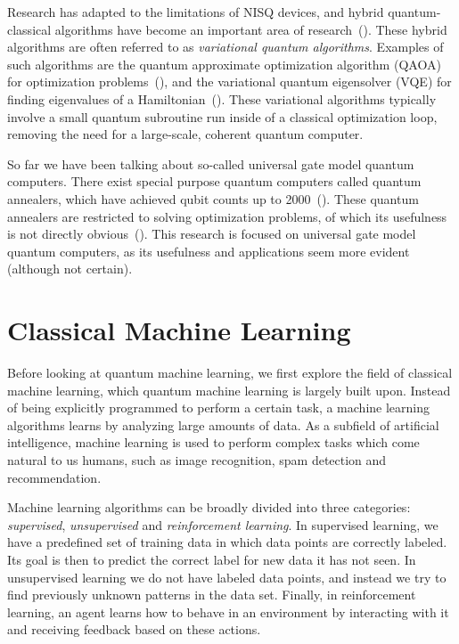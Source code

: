 \documentclass[a4paper,10pt]{article}
\begin{document}
Research has adapted to the limitations of NISQ devices, and hybrid quantum-classical algorithms have become an important area of research~(\cite{mcclean2016theory, guerreschi2017practical}).
These hybrid algorithms are often referred to as \emph{variational quantum algorithms}.
Examples of such algorithms are the quantum approximate optimization algorithm (QAOA) for optimization problems~(\cite{qaoa}), and the variational quantum eigensolver (VQE) for finding eigenvalues of a Hamiltonian~(\cite{vqe}).
These variational algorithms typically involve a small quantum subroutine run inside of a classical optimization loop, removing the need for a large-scale, coherent quantum computer.

So far we have been talking about so-called universal gate model quantum computers.
There exist special purpose quantum computers called quantum annealers, which have achieved qubit counts up to 2000~(\cite{dwave-2000}).
These quantum annealers are restricted to solving optimization problems, of which its usefulness is not directly obvious~(\cite{how-quantum-dwave, aaronson-dwave, detecting-quantum-speedup}).
This research is focused on universal gate model quantum computers, as its usefulness and applications seem more evident (although not certain).

\section{Classical Machine Learning} \label{sec:classical-ml}
Before looking at quantum machine learning, we first explore the field of classical machine learning, which quantum machine learning is largely built upon.
Instead of being explicitly programmed to perform a certain task, a machine learning algorithms learns by analyzing large amounts of data.
As a subfield of artificial intelligence, machine learning is used to perform complex tasks which come natural to us humans, such as image recognition, spam detection and recommendation.

Machine learning algorithms can be broadly divided into three categories: \emph{supervised}, \emph{unsupervised} and \emph{reinforcement learning}.
In supervised learning, we have a predefined set of training data in which data points are correctly labeled.
Its goal is then to predict the correct label for new data it has not seen.
In unsupervised learning we do not have labeled data points, and instead we try to find previously unknown patterns in the data set.
Finally, in reinforcement learning, an agent learns how to behave in an environment by interacting with it and receiving feedback based on these actions.
\end{document}
